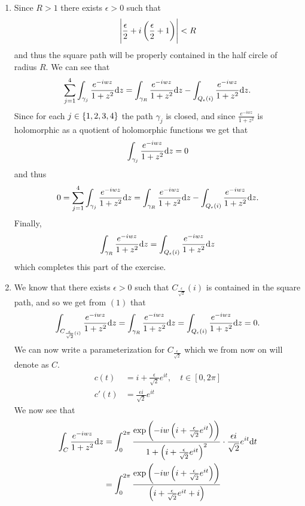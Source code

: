 \documentclass[11pt,a4paper]{article}
\begin{document}
\begin{solution} \phantom{}
\begin{enumerate}
  \item[(1)] Since $R > 1$ there exists $\epsilon > 0$ such that
    \[
      \abs{\frac{\epsilon}{2} + i \del{\frac{\epsilon}{2} + 1}} < R
    \]
    and thus the square path will be properly contained in the half circle
    of radius $R$.
    We can see that
    \[
      \sum_{j=1}^{4} \int_{\gamma_{j}} \frac{e^{-i w z}}{1 + z^2} \mathrm{d} z =
      \int_{\gamma_{R}} \frac{e^{-i w z}}{1 + z^2} \mathrm{d} z -
      \int_{Q_{\epsilon}(i)} \frac{e^{-i w z}}{1 + z^2} \mathrm{d} z.
    \]
    Since for each $j \in \left\{1,2,3,4\right\}$ the path $\gamma_j$ is closed,
    and since $\frac{e^{-i w z}}{1 + z^2}$ is holomorphic as a quotient of
    holomorphic functions we get that
    \[
      \int_{\gamma_{j}} \frac{e^{-i w z}}{1 + z^2} \mathrm{d} z = 0
    \]
    and thus
    \[
      0 = \sum_{j=1}^{4} \int_{\gamma_{j}} \frac{e^{-i w z}}{1 + z^2} \mathrm{d} z =
      \int_{\gamma_{R}} \frac{e^{-i w z}}{1 + z^2} \mathrm{d} z -
      \int_{Q_{\epsilon}(i)} \frac{e^{-i w z}}{1 + z^2} \mathrm{d} z.
    \]
    Finally,
    \[
      \int_{\gamma_{R}} \frac{e^{-i w z}}{1 + z^2} \mathrm{d} z =
      \int_{Q_{\epsilon}(i)} \frac{e^{-i w z}}{1 + z^2} \mathrm{d} z
    \]
    which completes this part of the exercise.
  \item[(2)] We know that there exists $\epsilon > 0$ such that
    $C_{\frac{\epsilon}{\sqrt 2}}(i)$ is contained in the square path,
    and so we get from $(1)$ that
    \[
      \int_{C_{\frac{\epsilon}{\sqrt 2}(i)}} \frac{e^{-i w z}}{1 + z^2} \mathrm{d} z =
      \int_{\gamma_{R}} \frac{e^{-i w z}}{1 + z^2} \mathrm{d} z =
      \int_{Q_{\epsilon}(i)} \frac{e^{-i w z}}{1 + z^2} \mathrm{d} z = 0.
    \]
    We can now write a parameterization for $C_{\frac{\epsilon}{\sqrt 2}}$
    which we from now on will denote as $C$.
    \begin{align*}
      c(t) &= i + \frac{\epsilon}{\sqrt 2} e^{i t}, \quad t \in [0,2 \pi] \\
      c'(t) &= \frac{\epsilon i}{\sqrt 2} e^{i t}
    \end{align*}
    We now see that
    \begin{align*}
      \int_{C} \frac{e^{-i w z}}{1 + z^2} \dz &=
      \int_{0}^{2 \pi}
      \frac{\exp\del{- i w \del{i + \frac{\epsilon}{\sqrt 2} e^{i t}}}}
      {1 + \del{i + \frac{\epsilon}{\sqrt 2} e^{i t}}^2} \cdot
      \frac{\epsilon i}{\sqrt 2} e^{i t} \dt \\ &=
      \int_{0}^{2 \pi}
      \frac{\exp\del{- i w \del{i + \frac{\epsilon}{\sqrt 2} e^{i t}}}}
      {\del{i + \frac{\epsilon}{\sqrt 2} e^{i t} + i}
}
\end{align*}
\end{enumerate}
\end{solution}
\end{document}
